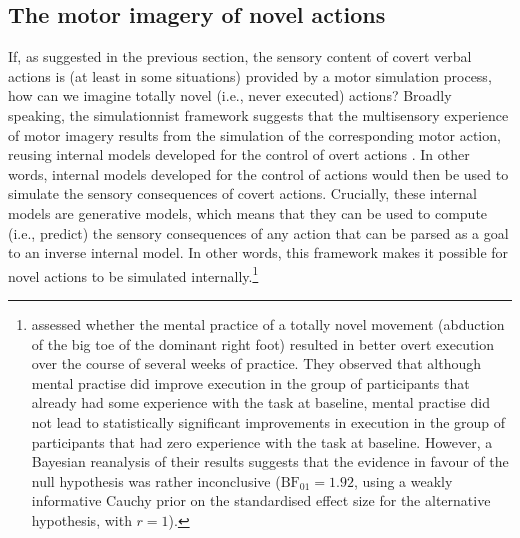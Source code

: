 \documentclass[utf8]{template/frontiersSCNS} %
\begin{document}

\subsection{The motor imagery of novel actions}

If, as suggested in the previous section, the sensory content of covert verbal actions is (at least in some situations) provided by a motor simulation process, how can we imagine totally novel (i.e., never executed) actions? Broadly speaking, the simulationnist framework suggests that the multisensory experience of motor imagery results from the simulation of the corresponding motor action, reusing internal models developed for the control of overt actions \citep[e.g.,][]{jeannerod_representing_1994}. In other words, internal models developed for the control of actions would then be used to simulate the sensory consequences of covert actions. Crucially, these internal models are generative models, which means that they can be used to compute (i.e., predict) the sensory consequences of any action that can be parsed as a \citep[possibly supramodal, see][]{loevenbruck_cognitive_2018} goal to an inverse internal model. In other words, this framework makes it possible for novel actions to be simulated internally.\footnote{\cite{mulder_role_2004} assessed whether the mental practice of a totally novel movement (abduction of the big toe of the dominant right foot) resulted in better overt execution over the course of several weeks of practice. They observed that although mental practise did improve execution in the group of participants that already had some experience with the task at baseline, mental practise did not lead to statistically significant improvements in execution in the group of participants that had zero experience with the task at baseline. However, a Bayesian reanalysis of their results suggests that the evidence in favour of the null hypothesis was rather inconclusive ($\text{BF}_{01} = 1.92$, using a weakly informative Cauchy prior on the standardised effect size for the alternative hypothesis, with $r = 1$).}
\end{document}
